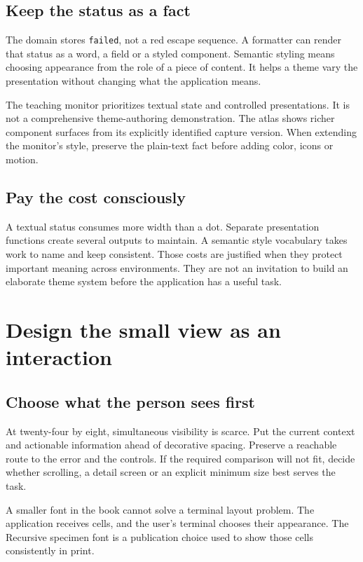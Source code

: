 \subsection{Keep the status as a fact}

The domain stores \texttt{failed}, not a red escape sequence. A formatter can render that status as a word, a field or a styled component. Semantic styling means choosing appearance from the role of a piece of content. It helps a theme vary the presentation without changing what the application means.

The teaching monitor prioritizes textual state and controlled presentations. It is not a comprehensive theme-authoring demonstration. The atlas shows richer component surfaces from its explicitly identified capture version. When extending the monitor's style, preserve the plain-text fact before adding color, icons or motion.

\subsection{Pay the cost consciously}

A textual status consumes more width than a dot. Separate presentation functions create several outputs to maintain. A semantic style vocabulary takes work to name and keep consistent. Those costs are justified when they protect important meaning across environments. They are not an invitation to build an elaborate theme system before the application has a useful task.

\section{Design the small view as an interaction}
\subsection{Choose what the person sees first}

At twenty-four by eight, simultaneous visibility is scarce. Put the current context and actionable information ahead of decorative spacing. Preserve a reachable route to the error and the controls. If the required comparison will not fit, decide whether scrolling, a detail screen or an explicit minimum size best serves the task.

A smaller font in the book cannot solve a terminal layout problem. The application receives cells, and the user's terminal chooses their appearance. The Recursive specimen font is a publication choice used to show those cells consistently in print.

